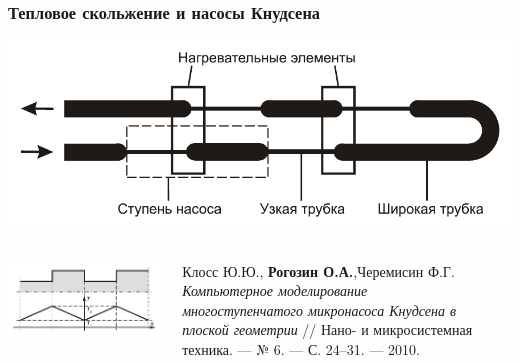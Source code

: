 \documentclass[ucs]{beamer}
\begin{document}
\begin{frame}
	\frametitle{Тепловое скольжение и насосы Кнудсена}
	\vspace{-10pt}
	\begin{center}
		\includegraphics[width=.8\textwidth]{pics/pump}
	\end{center}
	\vspace{-20pt}
	\begin{columns}
		\begin{center}
			\includegraphics[width=\textwidth]{pics/periodic}
		\end{center}
		\vspace{-20pt}
		\begin{block}{}\tiny
			Клосс Ю.Ю., \textbf{Рогозин О.А.},Черемисин Ф.Г.
			\textit{Компьютерное моделирование многоступенчатого микронасоса Кнудсена в плоской геометрии}
			// Нано- и микросистемная техника. — № 6. — С. 24–31. — 2010.
		\end{block}
		\begin{center}

\end{center}
\end{columns}
\end{frame}
\end{document}
